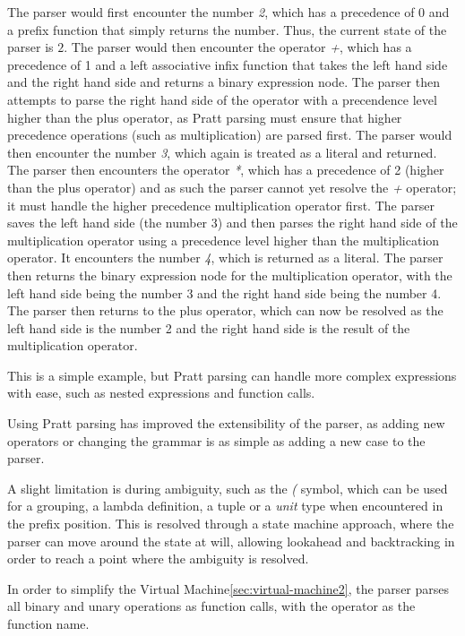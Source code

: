The parser would first encounter the number \textit{2}, which has a precedence of 0 and a prefix function that
simply returns the number.
Thus, the current state of the parser is $2$.
The parser would then encounter the operator \textit{+}, which has a precedence of 1 and a left associative infix
function that takes the left hand side and the right hand side and returns a binary expression node.
The parser then attempts to parse the right hand side of the operator with a precendence level higher than the
plus operator, as Pratt parsing must ensure that higher precedence operations (such as multiplication) are parsed
first.
The parser would then encounter the number \textit{3}, which again is treated as a literal and returned.
The parser then encounters the operator \textit{*}, which has a precedence of 2 (higher than the plus operator) and 
as such the parser cannot yet resolve the \textit{+} operator; it must handle the higher precedence multiplication
operator first.
The parser saves the left hand side (the number 3) and then parses the right hand side of the multiplication 
operator using a precedence level higher than the multiplication operator.
It encounters the number \textit{4}, which is returned as a literal.
The parser then returns the binary expression node for the multiplication operator, with the left hand side being
the number 3 and the right hand side being the number 4.
The parser then returns to the plus operator, which can now be resolved as the left hand side is the number 2 and the
right hand side is the result of the multiplication operator.

This is a simple example, but Pratt parsing can handle more complex expressions with ease, such as nested
expressions and function calls.

Using Pratt parsing has improved the extensibility of the parser, as adding new operators or changing the grammar
is as simple as adding a new case to the parser.

A slight limitation is during ambiguity, such as the \textit{(} symbol, which can be used for a grouping, a lambda 
definition, a tuple or a \textit{unit} type when encountered in the prefix position.
This is resolved through a state machine approach, where the parser can move around the state at will, allowing 
lookahead and backtracking in order to reach a point where the ambiguity is resolved.

In order to simplify the Virtual Machine\ref{sec:virtual-machine2}, the parser parses all binary and unary operations 
as function calls, with the operator as the function name.

